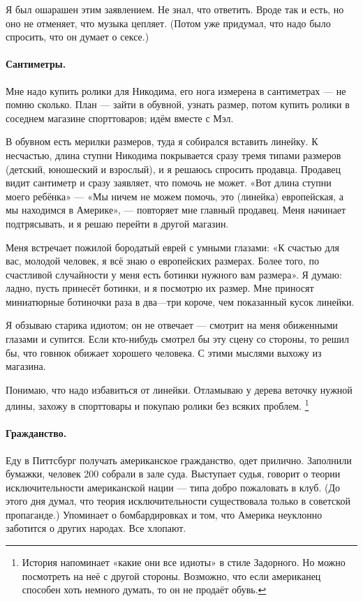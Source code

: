 \documentclass{book}
\begin{document}
Я был ошарашен этим заявлением.
Не знал, что ответить.
Вроде так и есть, но оно не отменяет, что музыка цепляет.
(Потом уже придумал, что надо было спросить, что он думает о сексе.)


\paragraph{Сантиметры.}
Мне надо купить ролики для Никодима, его нога измерена в сантиметрах --- не помню сколько.
План --- зайти в обувной, узнать размер, потом купить ролики в соседнем магазине спорттоваров; идём вместе с Мэл.

В обувном есть мерилки размеров, туда я собирался вставить линейку.
К несчастью, длина ступни Никодима покрывается сразу тремя типами размеров (детский, юношеский и взрослый),
и я решаюсь спросить продавца.
Продавец видит сантиметр и сразу заявляет, что помочь не может.
«Вот длина ступни моего ребёнка» --- «Мы ничем не можем помочь, это (линейка) европейская, а мы находимся в Америке», --- повторяет мне главный продавец.
Меня начинает подтрясывать, и я решаю перейти в другой магазин.

Меня встречает пожилой бородатый еврей с умными глазами: «К счастью для вас, молодой человек, я всё знаю о европейских размерах.
Более того, по счастливой случайности у меня есть ботинки нужного вам размера».
Я думаю: ладно, пусть принесёт ботинки, и я посмотрю их размер.
Мне приносят миниатюрные ботиночки раза в два---три короче, чем показанный кусок линейки.

Я обзываю старика идиотом;
он не отвечает --- смотрит на меня обиженными глазами и супится.
Если кто-нибудь смотрел бы эту сцену со стороны, то решил бы, что говнюк обижает хорошего человека.
С этими мыслями выхожу из магазина.

Понимаю, что надо избавиться от линейки.
Отламываю у дерева веточку нужной длины, захожу в спорттовары и покупаю ролики без всяких проблем.%
\footnote{История напоминает «какие они все идиоты» в стиле Задорного.
Но можно посмотреть на неё с другой стороны.
Возможно, что если американец способен хоть немного думать, то он не продаёт обувь.}

\paragraph{Гражданство.} 
Еду в Питтсбург получать американское гражданство, одет прилично.
Заполнили бумажки, человек 200 собрали в зале суда.
Выступает судья, говорит о теории исключительности американской нации
--- типа добро пожаловать в клуб.
(До этого дня думал, что теория исключительности существовала только в советской пропаганде.)
Упоминает о бомбардировках и том, что Америка неуклонно заботится о других народах.
Все хлопают.
\end{document}
